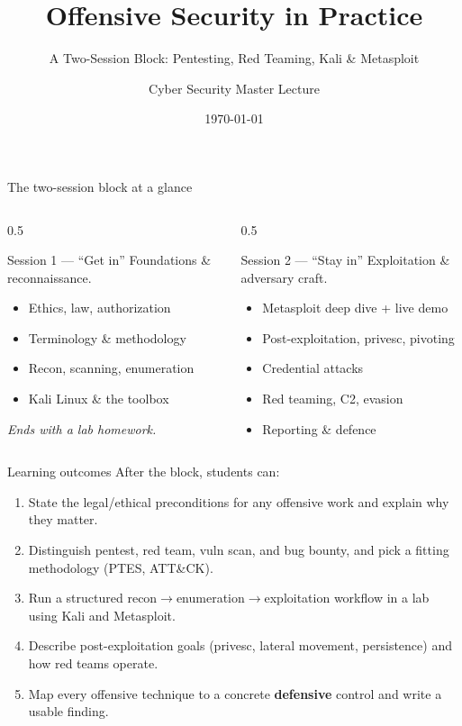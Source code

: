 \documentclass[aspectratio=169,11pt]{beamer}
\title{Offensive Security in Practice}
\subtitle{A Two-Session Block: Pentesting, Red Teaming, Kali \& Metasploit}
\author{Cyber Security Master Lecture}
\institute{HWR Berlin --- M.Sc.\ Business \& Information Systems}
\date{\today}
\begin{document}
\begin{frame}[plain]\titlepage\end{frame}

\begin{frame}{The two-session block at a glance}
  \begin{columns}[T]
    \begin{column}{0.5\textwidth}
      \begin{block}{Session 1 --- ``Get in''}
        \footnotesize Foundations \& reconnaissance.
        \begin{itemize}\footnotesize
          \item Ethics, law, authorization
          \item Terminology \& methodology
          \item Recon, scanning, enumeration
          \item Kali Linux \& the toolbox
        \end{itemize}
        \emph{Ends with a lab homework.}
      \end{block}
    \end{column}
    \begin{column}{0.5\textwidth}
      \begin{block}{Session 2 --- ``Stay in''}
        \footnotesize Exploitation \& adversary craft.
        \begin{itemize}\footnotesize
          \item Metasploit deep dive + live demo
          \item Post-exploitation, privesc, pivoting
          \item Credential attacks
          \item Red teaming, C2, evasion
          \item Reporting \& defence
        \end{itemize}
      \end{block}
    \end{column}
  \end{columns}
\end{frame}

\begin{frame}{Learning outcomes}
  After the block, students can:
  \begin{enumerate}
    \item State the legal/ethical preconditions for any offensive work and
          explain why they matter.
    \item Distinguish pentest, red team, vuln scan, and bug bounty, and pick a
          fitting methodology (PTES, ATT\&CK).
    \item Run a structured recon$\to$enumeration$\to$exploitation workflow in a
          lab using Kali and Metasploit.
    \item Describe post-exploitation goals (privesc, lateral movement,
          persistence) and how red teams operate.
    \item Map every offensive technique to a concrete \textbf{defensive}
          control and write a usable finding.
  \end{enumerate}
\end{frame}
\end{document}
